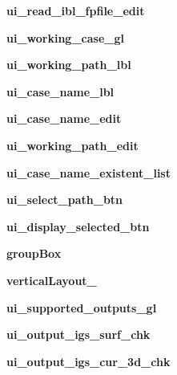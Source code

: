 \begin{DoxyCompactItemize}
{\bfseries ui\+\_\+read\+\_\+ibl\+\_\+fpfile\+\_\+edit}
\item 
\hypertarget{a00077_a050e1f0c2f0a5c8d15ca21021459c06d}{}\label{a00077_a050e1f0c2f0a5c8d15ca21021459c06d} 
{\bfseries ui\+\_\+working\+\_\+case\+\_\+gl}
\item 
\hypertarget{a00077_aae8ee2dceedfebed42a95b5122615de8}{}\label{a00077_aae8ee2dceedfebed42a95b5122615de8} 
{\bfseries ui\+\_\+working\+\_\+path\+\_\+lbl}
\item 
\hypertarget{a00077_a0d4435462e6a1f2672c93af7e87b719c}{}\label{a00077_a0d4435462e6a1f2672c93af7e87b719c} 
{\bfseries ui\+\_\+case\+\_\+name\+\_\+lbl}
\item 
\hypertarget{a00077_ac790262e3ac621cfe957cdd36f94d817}{}\label{a00077_ac790262e3ac621cfe957cdd36f94d817} 
{\bfseries ui\+\_\+case\+\_\+name\+\_\+edit}
\item 
\hypertarget{a00077_a7978ca560b83fbc4bd3859b7bba05153}{}\label{a00077_a7978ca560b83fbc4bd3859b7bba05153} 
{\bfseries ui\+\_\+working\+\_\+path\+\_\+edit}
\item 
\hypertarget{a00077_a007ebda4f46ac96952c59e60a2fa8f3b}{}\label{a00077_a007ebda4f46ac96952c59e60a2fa8f3b} 
{\bfseries ui\+\_\+case\+\_\+name\+\_\+existent\+\_\+list}
\item 
\hypertarget{a00077_a0f508ef0b3e47a027a63dd3cde363ef4}{}\label{a00077_a0f508ef0b3e47a027a63dd3cde363ef4} 
{\bfseries ui\+\_\+select\+\_\+path\+\_\+btn}
\item 
\hypertarget{a00077_adc08aa0dfe6e33f10acea28994425d3a}{}\label{a00077_adc08aa0dfe6e33f10acea28994425d3a} 
{\bfseries ui\+\_\+display\+\_\+selected\+\_\+btn}
\item 
\hypertarget{a00077_a4ed36f6ea3986be4c380c6f5ba4587d4}{}\label{a00077_a4ed36f6ea3986be4c380c6f5ba4587d4} 
{\bfseries group\+Box}
\item 
\hypertarget{a00077_ab105030a0e14f15ea1514f18cd3202b7}{}\label{a00077_ab105030a0e14f15ea1514f18cd3202b7} 
{\bfseries vertical\+Layout\+\_}
\item 
\hypertarget{a00077_a1c1efdbb64f8efbd47af031c8817f807}{}\label{a00077_a1c1efdbb64f8efbd47af031c8817f807} 
{\bfseries ui\+\_\+supported\+\_\+outputs\+\_\+gl}
\item 
\hypertarget{a00077_a204f840f1c7dc77ccd5d23fcbe6dd3c7}{}\label{a00077_a204f840f1c7dc77ccd5d23fcbe6dd3c7} 
{\bfseries ui\+\_\+output\+\_\+igs\+\_\+surf\+\_\+chk}
\item 
\hypertarget{a00077_a306e3ab99bf3dfab97fa540a27d15cbe}{}\label{a00077_a306e3ab99bf3dfab97fa540a27d15cbe} 
{\bfseries ui\+\_\+output\+\_\+igs\+\_\+cur\+\_\+3d\+\_\+chk}

\end{DoxyCompactItemize}
